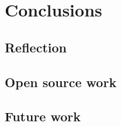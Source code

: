 \chapter{Conclusions}
\label{ch:conclusions} %



\section{Reflection}
\label{sec:reflection} %

\section{Open source work}
\label{sec:open-source-work} %


\section{Future work}
\label{sec:future-work} %

